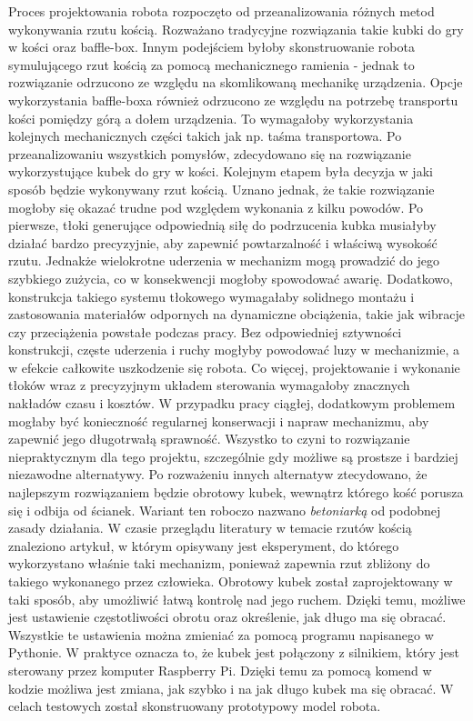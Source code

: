Proces projektowania robota rozpoczęto od przeanalizowania różnych metod wykonywania rzutu kością. Rozważano tradycyjne rozwiązania takie kubki do gry w kości oraz baffle-box.
Innym podejściem byłoby skonstruowanie robota symulującego rzut kością za pomocą mechanicznego ramienia - jednak to rozwiązanie odrzucono ze względu na 
skomlikowaną mechanikę urządzenia. Opcje wykorzystania baffle-boxa również odrzucono ze względu na potrzebę transportu kości pomiędzy górą a dołem urządzenia. To wymagałoby
wykorzystania kolejnych mechanicznych części takich jak np. taśma transportowa.
Po przeanalizowaniu wszystkich pomysłów, zdecydowano się na rozwiązanie wykorzystujące kubek do gry w kości. Kolejnym etapem była decyzja w jaki sposób 
będzie wykonywany rzut kością. Uznano jednak, że takie rozwiązanie mogłoby się okazać trudne pod względem wykonania z kilku powodów. Po pierwsze, tłoki 
generujące odpowiednią siłę do podrzucenia kubka musiałyby działać bardzo precyzyjnie, aby zapewnić powtarzalność i właściwą wysokość rzutu. Jednakże 
wielokrotne uderzenia w mechanizm mogą prowadzić do jego szybkiego zużycia, co w konsekwencji mogłoby spowodować awarię.
Dodatkowo, konstrukcja takiego systemu tłokowego wymagałaby solidnego montażu i zastosowania materiałów odpornych na dynamiczne obciążenia, takie jak 
wibracje czy przeciążenia powstałe podczas pracy. Bez odpowiedniej sztywności konstrukcji, częste uderzenia i ruchy mogłyby powodować luzy w mechanizmie, 
a w efekcie całkowite uszkodzenie się robota.
Co więcej, projektowanie i wykonanie tłoków wraz z precyzyjnym układem sterowania wymagałoby znacznych nakładów czasu i kosztów. W przypadku pracy 
ciągłej, dodatkowym problemem mogłaby być konieczność regularnej konserwacji i napraw mechanizmu, aby zapewnić jego długotrwałą sprawność. Wszystko to 
czyni to rozwiązanie niepraktycznym dla tego projektu, szczególnie gdy możliwe są prostsze i bardziej niezawodne alternatywy. Po rozważeniu innych alternatyw
ztecydowano, że najlepszym rozwiązaniem będzie obrotowy kubek, wewnątrz którego kość porusza się i odbija od ścianek. Wariant ten roboczo nazwano \textit{betoniarką} od podobnej 
zasady działania. W czasie przeglądu literatury w temacie rzutów kością znaleziono artykuł, w którym opisywany jest eksperyment, do którego wykorzystano właśnie taki 
mechanizm, ponieważ zapewnia rzut zbliżony do takiego wykonanego przez człowieka.\cite{PK} Obrotowy kubek został zaprojektowany w taki 
sposób, aby umożliwić łatwą kontrolę nad jego ruchem. Dzięki temu, możliwe jest ustawienie częstotliwości obrotu oraz określenie, jak długo ma się obracać. Wszystkie te ustawienia 
można zmieniać za pomocą programu napisanego w Pythonie. W praktyce oznacza to, że kubek jest połączony z silnikiem, który jest sterowany przez komputer 
Raspberry Pi. Dzięki temu za pomocą komend w kodzie możliwa jest zmiana, jak szybko i na jak długo kubek ma się obracać.
W celach testowych został skonstruowany prototypowy model robota.

